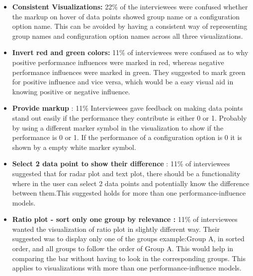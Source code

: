 \begin{itemize}
\item \textbf{Consistent Visualizations: } 22\% of the interviewees were confused whether the markup on hover of data points showed group name or a configuration option name. This can be avoided by having a consistent way of representing group names and configuration option names across all three visualizations. 

\item \textbf{Invert red and green colors:} 11\% of interviewees were confused as to why positive performance influences were marked in red, whereas negative performance influences were marked in green. They suggested to mark green for positive influence and vice versa, which would be a easy visual aid in knowing positive or negative influence.
   
\item \textbf{Provide markup} : 11\% Interviewees gave feedback on making data points stand out easily if the performance they contribute is either 0 or 1. Probably by using a different marker symbol in the visualization to show if the performance is 0 or 1. If the performance of a configuration option is 0 it is shown by a empty white marker symbol.

\item \textbf{Select 2 data point to show their difference} : 11\% of interviewees suggested that for radar plot and text plot, there should be a functionality where in the user can select 2 data points and potentially know the difference between them.This suggested holds for more than one performance-influence models.

\item \textbf{Ratio plot - sort only one group by relevance :} 11\% of interviewees wanted the visualization of ratio plot in slightly different way. Their suggested was to display only one of the groups example:Group A, in sorted order, and all groups to follow the order of Group A. This would help in comparing the bar without having to look in the corresponding groups. This applies to visualizations with more than one performance-influence models.

\end{itemize}


